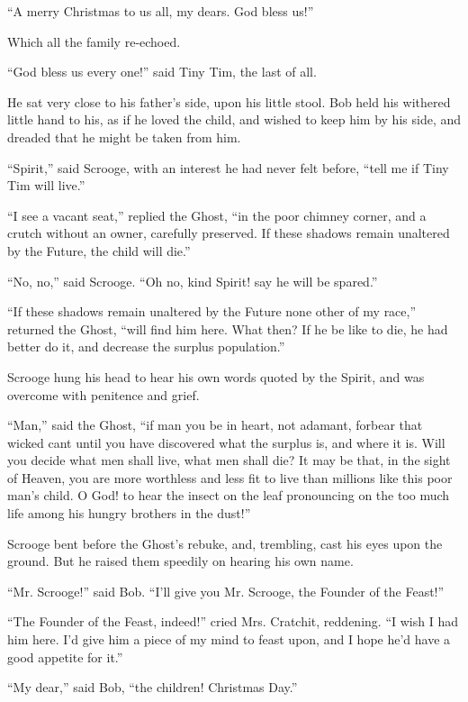 \documentclass[paper=5.5in:8.5in,BCOR=15mm,twoside,DIV=15,headinclude=off,12pt,chapterprefix=off,openany,headings=huge]{scrbook} %
\begin{document}
\enquote{A merry Christmas to us all, my dears. God bless us!}

Which all the family re-echoed.

\enquote{God bless us every one!} said Tiny Tim, the last of all.

He sat very close to his father's side, upon his little stool. Bob held his withered little hand to his, as if he loved the child, and wished to keep him by his side, and dreaded that he might be taken from him.

\enquote{Spirit,} said Scrooge, with an interest he had never felt before, \enquote{tell me if Tiny Tim will live.}

\enquote{I see a vacant seat,} replied the Ghost, \enquote{in the poor chimney corner, and a crutch without an owner, carefully preserved. If these shadows remain unaltered by the Future, the child will die.}

\enquote{No, no,} said Scrooge. \enquote{Oh no, kind Spirit! say he will be spared.}

\enquote{If these shadows remain unaltered by the Future none other of my race,} returned the Ghost, \enquote{will find him here. What then? If he be like to die, he had better do it, and decrease the surplus population.}

Scrooge hung his head to hear his own words quoted by the Spirit, and was overcome with penitence and grief.

\enquote{Man,} said the Ghost, \enquote{if man you be in heart, not adamant, forbear that wicked cant until you have discovered what the surplus is, and where it is. Will you decide what men shall live, what men shall die? It may be that, in the sight of Heaven, you are more worthless and less fit to live than millions like this poor man's child. O God! to hear the insect on the leaf pronouncing on the too much life among his hungry brothers in the dust!}

Scrooge bent before the Ghost's rebuke, and, trembling, cast his eyes upon the ground. But he raised them speedily on hearing his own name.

\enquote{Mr. Scrooge!} said Bob. \enquote{I'll give you Mr. Scrooge, the Founder of the Feast!}

\enquote{The Founder of the Feast, indeed!} cried Mrs. Cratchit, reddening. \enquote{I wish I had him here. I'd give him a piece of my mind to feast upon, and I hope he'd have a good appetite for it.}

\enquote{My dear,} said Bob, \enquote{the children! Christmas Day.}
\end{document}
